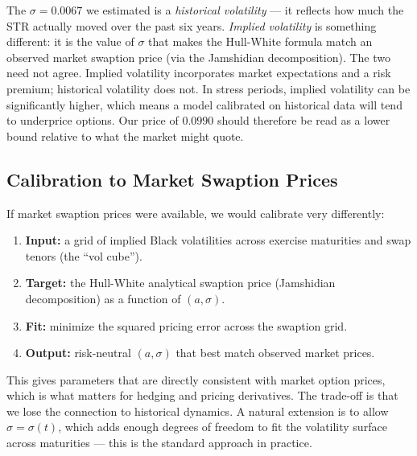 \documentclass[12pt, a4paper]{article}
\begin{document}
The $\sigma = 0.0067$ we estimated is a \textit{historical volatility} — it reflects how much the \texteuro STR actually moved over the past six years. \textit{Implied volatility} is something different: it is the value of $\sigma$ that makes the Hull-White formula match an observed market swaption price (via the Jamshidian decomposition). The two need not agree. Implied volatility incorporates market expectations and a risk premium; historical volatility does not. In stress periods, implied volatility can be significantly higher, which means a model calibrated on historical data will tend to underprice options. Our price of $0.0990$ should therefore be read as a lower bound relative to what the market might quote.

\subsection{Calibration to Market Swaption Prices}

If market swaption prices were available, we would calibrate very differently:
\begin{enumerate}
    \item \textbf{Input:} a grid of implied Black volatilities across exercise maturities and swap tenors (the ``vol cube'').
    \item \textbf{Target:} the Hull-White analytical swaption price (Jamshidian decomposition) as a function of $(a, \sigma)$.
    \item \textbf{Fit:} minimize the squared pricing error across the swaption grid.
    \item \textbf{Output:} risk-neutral $(a, \sigma)$ that best match observed market prices.
\end{enumerate}
This gives parameters that are directly consistent with market option prices, which is what matters for hedging and pricing derivatives. The trade-off is that we lose the connection to historical dynamics. A natural extension is to allow $\sigma = \sigma(t)$, which adds enough degrees of freedom to fit the volatility surface across maturities — this is the standard approach in practice.
\end{document}
